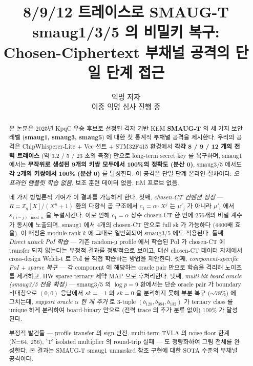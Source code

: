 \documentclass[11pt]{article}
\title{8/9/12 트레이스로 SMAUG-T smaug1/3/5 의 비밀키 복구:\\
       Chosen-Ciphertext 부채널 공격의 단일 단계 접근}
\author{%
  익명 저자 \\
  이중 익명 심사 진행 중
}
\theoremstyle{plain}
\theoremstyle{definition}
\theoremstyle{remark}
\newcommand{\Zq}{\mathbb{Z}_q}
\begin{document}
\maketitle

\begin{abstract}
본 논문은 2025년 KpqC 우승 후보로 선정된 격자 기반 KEM \textbf{SMAUG-T} 의
세 가지 보안 레벨 (\textbf{smaug1, smaug3, smaug5}) 에 대한 첫 통계적 부채널
공격을 제시한다. 우리의 공격은 ChipWhisperer-Lite + Vcc 션트 + STM32F415
환경에서 \textbf{각각 8 / 9 / 12 개의 전력 트레이스} (약 3.2 / 5 / 23 초의 측정)
만으로 long-term secret key 를 복구하며, smaug1 에서는 \textbf{무작위로 생성된
9개의 키쌍 모두에서 100\%의 정확도 (분산 0)}, smaug3/5 에서도 \textbf{각 2개의
키쌍에서 100\% (분산 0)} 를 달성한다. 이 공격은 단일 단계 온라인 절차이다:
\emph{오프라인 템플릿 학습 없음}, 보조 훈련 데이터 없음, EM 프로브 없음.

네 가지 방법론적 기여가 이 결과를 가능하게 한다.
첫째, \emph{chosen-CT 컨벤션 정정} — $R = \Zq[X]/(X^n+1)$ 환의 다항식 곱 구조에서
$c_1 = \alpha \cdot X^j$ 는 $\mu'_j$ 가 아니라 $\mu'_i$ 에서 $s_{(i-j) \mod n}$
을 누설시킨다. 이로 인해 $c_1 = \alpha$ 상수 chosen-CT 한 번에 256개의 비밀
계수가 동시에 노출되며, smaug1 에서 4개의 chosen-CT 만으로 full sk 가 가능하다
(4400배 효율). 이 매핑은 module rank $k$ 에 그대로 일반화되어 smaug3/5 에도 적용된다.
둘째, \emph{Direct attack PoI 학습} — 기존 random-µ profile 에서 학습된
PoI 가 chosen-CT 에 transfer 되지 않는다는 부정적 결과를 정량적으로 보이고,
대신 chosen-CT 데이터 자체에서 cross-design Welch-t 로 PoI 를 직접 학습하는
방법을 제안한다. 셋째, \emph{component-specific PoI + sparse 복구} — 각
component 에 해당하는 oracle pair 만으로 학습을 격리해 노이즈를 제거하고,
HW sparse ternary 제약 MAP 으로 후처리한다. 넷째, \emph{multi-bit board oracle
(smaug3/5 전용 확장)} — smaug3/5 의 $\log p = 9$ 환에서는 단순 oracle pair 가
boundary 비대칭으로 $(0,0)$ 응답에서 $\mathit{sk}=-1$ 와 $\mathit{sk}=0$ 을
분리하지 못해 부분 복구 ($\sim$78\%) 에 그치는데, \emph{support oracle $\alpha$
한 개 추가} 로 3-tuple $(b_{128}, b_{384}, b_{132})$ 가 ternary class 를 unique
하게 분리하여 board-binary 만으로 (전력 trace 의 추가 분류 없이) 100\% 가 달성된다.

부정적 발견들 — profile transfer 의 sign 반전, multi-term TVLA 의 noise floor
한계 (N=64, 256), 'T' isolated multiplier 의 round-trip 실패 — 도 정량화하여
그림 전체를 완성한다. 본 결과는 SMAUG-T smaug1 unmasked 참조 구현에
대한 SOTA 수준의 부채널 공격이다.
\end{abstract}
\end{document}
